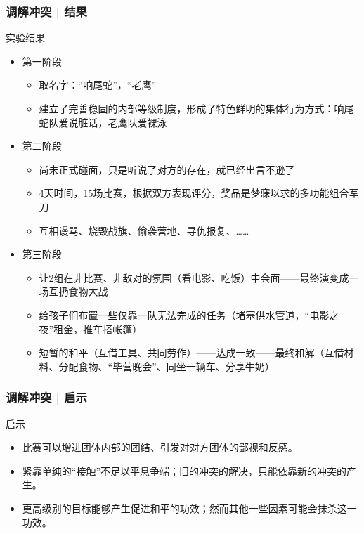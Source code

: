 \begin{frame}
  \frametitle{调解冲突 | 结果}
  \begin{block}{实验结果}
    \begin{itemize}
      \item 第一阶段
    \begin{itemize}
      \item 取名字：“响尾蛇”，“老鹰”
      \item 建立了完善稳固的内部等级制度，形成了特色鲜明的集体行为方式：响尾蛇队爱说脏话，老鹰队爱裸泳
    \end{itemize}
      \item 第二阶段
    \begin{itemize}
      \item 尚未正式碰面，只是听说了对方的存在，就已经出言不逊了
      \item 4天时间，15场比赛，根据双方表现评分，奖品是梦寐以求的多功能组合军刀
      \item 互相谩骂、烧毁战旗、偷袭营地、寻仇报复、……
    \end{itemize}
      \item 第三阶段
    \begin{itemize}
      \item 让2组在非比赛、非敌对的氛围（看电影、吃饭）中会面——最终演变成一场互扔食物大战
      \item 给孩子们布置一些仅靠一队无法完成的任务（堵塞供水管道，“电影之夜”租金，推车搭帐篷）
      \item 短暂的和平（互借工具、共同劳作）——达成一致——最终和解（互借材料、分配食物、“毕营晚会”、同坐一辆车、分享牛奶）
    \end{itemize}
    \end{itemize}
  \end{block}
\end{frame}

\begin{frame}
  \frametitle{调解冲突 | 启示}
  \begin{block}{启示}
    \begin{itemize}
      \item 比赛可以增进团体内部的团结、引发对对方团体的鄙视和反感。
      \item 紧靠单纯的“接触”不足以平息争端；旧的冲突的解决，只能依靠新的冲突的产生。
      \item 更高级别的目标能够产生促进和平的功效；然而其他一些因素可能会抹杀这一功效。
    \end{itemize}
  \end{block}
\end{frame}

